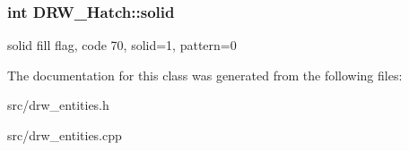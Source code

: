 \subsubsection[{solid}]{\setlength{\rightskip}{0pt plus 5cm}int D\+R\+W\+\_\+\+Hatch\+::solid}\label{class_d_r_w___hatch_a4eec0fc3cd839a3892e875bcc9789d48}
solid fill flag, code 70, solid=1, pattern=0 

The documentation for this class was generated from the following files\+:\begin{DoxyCompactItemize}
\item 
src/drw\+\_\+entities.\+h\item 
src/drw\+\_\+entities.\+cpp\end{DoxyCompactItemize}
